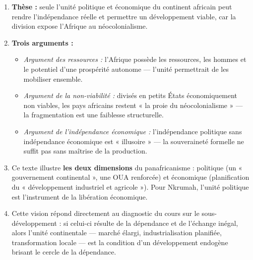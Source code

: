 \documentclass[11pt]{article}
\begin{document}
\begin{corrige}
\begin{enumerate}
\item \textbf{Thèse :} seule l'unité politique et économique du continent africain peut rendre l'indépendance réelle et permettre un développement viable, car la division expose l'Afrique au néocolonialisme.
\item \textbf{Trois arguments :}
\begin{itemize}
\item \emph{Argument des ressources :} l'Afrique possède les ressources, les hommes et le potentiel d'une prospérité autonome — l'unité permettrait de les mobiliser ensemble.
\item \emph{Argument de la non-viabilité :} divisés en petits États économiquement non viables, les pays africains restent « la proie du néocolonialisme » — la fragmentation est une faiblesse structurelle.
\item \emph{Argument de l'indépendance économique :} l'indépendance politique sans indépendance économique est « illusoire » — la souveraineté formelle ne suffit pas sans maîtrise de la production.
\end{itemize}
\item Ce texte illustre \textbf{les deux dimensions} du panafricanisme : politique (un « gouvernement continental », une OUA renforcée) et économique (planification du « développement industriel et agricole »). Pour Nkrumah, l'unité politique est l'instrument de la libération économique.
\item Cette vision répond directement au diagnostic du cours sur le sous-développement : si celui-ci résulte de la dépendance et de l'échange inégal, alors l'unité continentale — marché élargi, industrialisation planifiée, transformation locale — est la condition d'un développement endogène brisant le cercle de la dépendance.
\end{enumerate}
\end{corrige}
\end{document}
